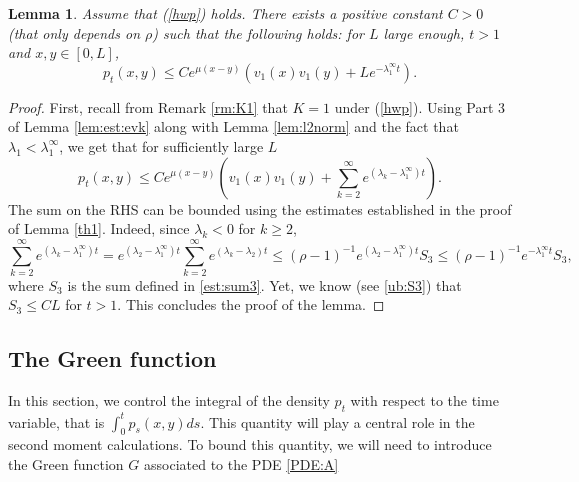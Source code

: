 \documentclass[11pt]{article}
\theoremstyle{plain}
\newtheorem{lemma}{Lemma}[section]
\newcommand\linf{\lambda_1^\infty}
\begin{document}
\begin{lemma}\label{lem:212}
Assume that (\ref{hwp}) holds. There exists a positive constant $C>0$ (that only depends on $\rho$) such that  the following holds: for $L$ large enough, $t>1$ and $x,y\in[0,L]$,
\begin{equation*}
p_t(x,y)\leqslant Ce^{\mu(x-y)}\left(v_1(x)v_1(y)+Le^{-\linf t}\right).
\end{equation*} 
\end{lemma}
\begin{proof} First, recall from Remark \ref{rm:K1} that $K=1$ under (\ref{hwp}). 
 Using Part 3 of Lemma \ref{lem:est:evk} along with Lemma \ref{lem:l2norm} and the fact that $\lambda_1<\linf$, we get that for sufficiently large $L$
 \begin{equation*}
p_t(x,y)\leqslant Ce^{\mu(x-y)}\left(v_1(x)v_1(y)+\sum_{k=2}^\infty e^{(\lambda_k-\linf)t}\right).
\end{equation*}
The sum on the RHS can be bounded using the estimates established in the proof of Lemma \ref{th1}. Indeed, since $\lambda_k<0$ for $k\geq 2$, 
\begin{equation*}
\sum_{k=2}^\infty e^{(\lambda_k-\linf)t}=e^{(\lambda_2-\linf)t}\sum_{k=2}^\infty e^{(\lambda_k-\lambda_2)t}\leqslant (\rho-1)^{-1}e^{(\lambda_2-\linf)t}S_3\leqslant  (\rho-1)^{-1}e^{-\linf t}S_3,
\end{equation*}
where $S_3$ is the sum defined in \eqref{est:sum3}. Yet, we know (see \eqref{ub:S3}) that $S_3\leqslant CL$ for $t>1$. This concludes the proof of the lemma.
\end{proof}





\subsection{The Green function}\label{sec:green}


In this section, we control the integral of the density $p_t$  with respect to the time variable, that is $
\int_0^tp_s(x,y)ds. $
This quantity will play a central role in the second moment calculations. To bound this quantity, we will need to introduce the Green function $G$ associated to the PDE \eqref{PDE:A}
\end{document}
